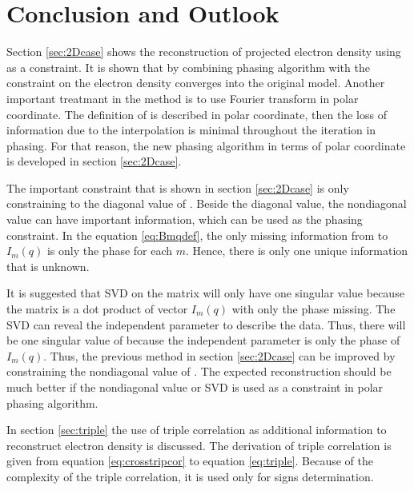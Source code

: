 \clearpage
\chapter{Conclusion and Outlook}\label{ch:futureimp}

Section \ref{sec:2Dcase} shows the reconstruction of projected electron density using \Bmq as a constraint. It is shown that by combining phasing algorithm with the constraint on \Bmq  the electron density converges into the original model. Another important treatmant in the method is to use Fourier transform in polar coordinate. The definition of \Bmq is described in polar coordinate, then the loss of information due to the interpolation is minimal throughout the iteration in phasing. For that reason, the new phasing algorithm in terms of polar coordinate is developed in section \ref{sec:2Dcase}.     

The important constraint that is shown in section \ref{sec:2Dcase} is only constraining to the diagonal value of \Bmq. Beside the diagonal value, the nondiagonal value can have important information, which can be used as the phasing constraint. In the equation \ref{eq:Bmqdef}, the only missing information from \Bmq to $I_{m}(q)$ is only the phase for each $m$. Hence, there is only one unique information that is unknown. 

It is suggested that SVD on the matrix \Bmq will only have one singular value because the matrix \Bmq is a dot product of vector $I_{m}(q)$ with only the phase missing. The SVD can reveal the independent parameter to describe the data. Thus, there will be one singular value of \Bmq because the independent parameter is only the phase of $I_{m}(q)$. Thus, the previous method in section \ref{sec:2Dcase} can be improved by constraining the nondiagonal value of \Bmq. The expected reconstruction should be much better if the nondiagonal value or SVD is used as a constraint in polar phasing algorithm.  


In section \ref{sec:triple} the use of triple correlation as additional information to reconstruct electron density is discussed. The derivation of triple correlation is given from equation \ref{eq:crosstripcor} to equation \ref{eq:triple}. Because of the complexity of the triple correlation, it is used only for signs determination. 


